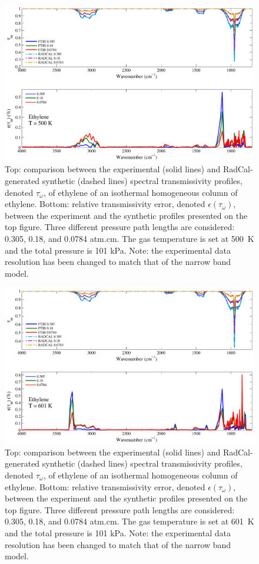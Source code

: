 \begin{figure}[p]
\includegraphics[width=\textwidth]{../Verification/Results_Test2/Ethylene_500.pdf}
\caption{Top: comparison between the experimental (solid lines) and RadCal-generated synthetic (dashed lines) spectral transmissivity profiles, denoted $\tau_{\omega}$, of ethylene of an isothermal homogeneous column of ethylene. Bottom: relative transmissivity error, denoted $\epsilon{(\tau_{\omega})}$, between the experiment and the synthetic profiles presented on the top figure. Three different pressure path lengths are considered: 0.305, 0.18, and 0.0784 atm.cm. The gas temperature is set at 500~K and the total pressure is 101 kPa. Note: the experimental data resolution has been changed to match that of the narrow band model. \label{fig:ethylene_Verify_500K}}
\end{figure}

\begin{figure}[p]
\includegraphics[width=\textwidth]{../Verification/Results_Test2/Ethylene_601.pdf}
\caption{Top: comparison between the experimental (solid lines) and RadCal-generated synthetic (dashed lines) spectral transmissivity profiles, denoted $\tau_{\omega}$, of ethylene of an isothermal homogeneous column of ethylene. Bottom: relative transmissivity error, denoted $\epsilon{(\tau_{\omega})}$, between the experiment and the synthetic profiles presented on the top figure. Three different pressure path lengths are considered: 0.305, 0.18, and 0.0784 atm.cm. The gas temperature is set at 601~K and the total pressure is 101 kPa. Note: the experimental data resolution has been changed to match that of the narrow band model. \label{fig:ethylene_Verify_600K}}
\end{figure}

